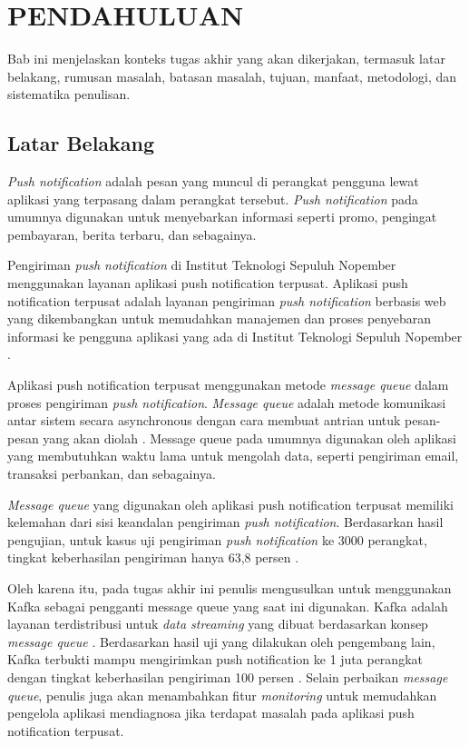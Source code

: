 \vspace{0ex}
\chapter {PENDAHULUAN}
\par Bab ini menjelaskan konteks tugas akhir yang akan dikerjakan, termasuk latar belakang, rumusan masalah, batasan masalah, tujuan, manfaat, metodologi, dan sistematika penulisan.

\section{Latar Belakang}
\par \textit{Push notification} adalah pesan yang muncul di perangkat pengguna lewat aplikasi yang terpasang dalam perangkat tersebut. \textit{Push notification} pada umumnya digunakan untuk menyebarkan informasi seperti promo, pengingat pembayaran, berita terbaru, dan sebagainya.
\par Pengiriman \textit{push notification} di Institut Teknologi Sepuluh Nopember menggunakan layanan aplikasi push notification terpusat. Aplikasi push notification terpusat adalah layanan pengiriman \textit{push notification} berbasis web yang dikembangkan untuk memudahkan manajemen dan proses penyebaran informasi ke pengguna aplikasi yang ada di Institut Teknologi Sepuluh Nopember \cite{application-thesis}.
\par Aplikasi push notification terpusat menggunakan metode \textit{message queue} dalam proses pengiriman \textit{push notification}. \textit{Message queue} adalah metode komunikasi antar sistem secara asynchronous dengan cara membuat antrian untuk pesan-pesan yang akan diolah \cite{message-queue-online}. Message queue pada umumnya digunakan oleh aplikasi yang membutuhkan waktu lama untuk mengolah data, seperti pengiriman email, transaksi perbankan, dan sebagainya.
\par \textit{Message queue} yang digunakan oleh aplikasi push notification terpusat memiliki kelemahan dari sisi keandalan pengiriman \textit{push notification}. Berdasarkan hasil pengujian, untuk kasus uji pengiriman \textit{push notification} ke 3000 perangkat, tingkat keberhasilan pengiriman hanya 63,8 persen \cite{application-thesis}.
\par Oleh karena itu, pada tugas akhir ini penulis mengusulkan untuk menggunakan Kafka sebagai pengganti message queue yang saat ini digunakan. Kafka adalah layanan terdistribusi untuk \textit{data streaming} yang dibuat berdasarkan konsep \textit{message queue} \cite{kafka-online}. Berdasarkan hasil uji yang dilakukan oleh pengembang lain, Kafka terbukti mampu mengirimkan push notification ke 1 juta perangkat dengan tingkat keberhasilan pengiriman 100 persen \cite{prototype-article}. Selain perbaikan \textit{message queue}, penulis juga akan menambahkan fitur \textit{monitoring} untuk memudahkan pengelola aplikasi mendiagnosa jika terdapat masalah pada aplikasi push notification terpusat.

